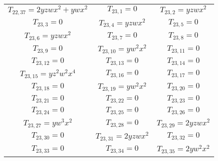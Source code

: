 \begin{longtable}{|c|c|c|}
$T_{22,37}= 2yzwx^2+ywx^2$&

$T_{23,1}= 0$&

$T_{23,2}= yzwx^2$\\

$T_{23,3}= 0$&

$T_{23,4}= yzwx^2$&

$T_{23,5}= 0$\\

$T_{23,6}= yzwx^2$&

$T_{23,7}= 0$&

$T_{23,8}= 0$\\

$T_{23,9}= 0$&

$T_{23,10}= yw^2x^2$&

$T_{23,11}= 0$\\

$T_{23,12}= 0$&

$T_{23,13}= 0$&

$T_{23,14}= 0$\\

$T_{23,15}= yz^2w^2x^4$&

$T_{23,16}= 0$&

$T_{23,17}= 0$\\

$T_{23,18}= 0$&

$T_{23,19}= yw^2x^2$&

$T_{23,20}= 0$\\

$T_{23,21}= 0$&

$T_{23,22}= 0$&

$T_{23,23}= 0$\\

$T_{23,24}= 0$&

$T_{23,25}= 0$&

$T_{23,26}= 0$\\

$T_{23,27}= yw^3x^2$&

$T_{23,28}= 0$&

$T_{23,29}= 2yzwx^2$\\

$T_{23,30}= 0$&

$T_{23,31}= 2yzwx^2$&

$T_{23,32}= 0$\\

$T_{23,33}= 0$&

$T_{23,34}= 0$&

$T_{23,35}= 2yw^2x^2$\\


\end{longtable}
